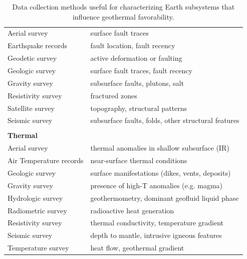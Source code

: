 \begin{table}
\begin{tabular}{ll}
Aerial survey           & surface fault traces                                     \\
Earthquake records      & fault location, fault recency                                  \\
Geodetic survey         & active deformation or faulting                           \\
Geologic survey         & surface fault traces, fault recency                      \\
Gravity survey          & subsurface faults, plutons, salt                         \\
Resistivity survey      & fractured zones                                          \\
Satellite survey        & topography, structural patterns                          \\
Seismic survey          & subsurface faults, folds, other structural features      \\
                        &                                                          \\
\textbf{Thermal}        &                                                          \\ \hline
Aerial survey           & thermal anomalies in shallow subsurface (IR)             \\
Air Temperature records & near-surface thermal conditions                          \\
Geologic survey         & surface manifestations (dikes, vents, deposits)          \\
Gravity survey          & presence of high-T anomalies (e.g. magma)                \\
Hydrologic survey       & geothermometry, dominant geofluid liquid phase           \\
Radiometric survey      & radioactive heat generation                              \\
Resistivity survey      & thermal conductivity, temperature gradient               \\
Seismic survey          & depth to mantle, intrusive igneous features              \\
Temperature survey      & heat flow, geothermal gradient                          
\end{tabular}
\caption[Data-collection methods for geothermal subsystems]{Data collection methods useful for characterizing Earth subsystems that influence geothermal favorability.}
\label{tab:survey_types}
\end{table}

